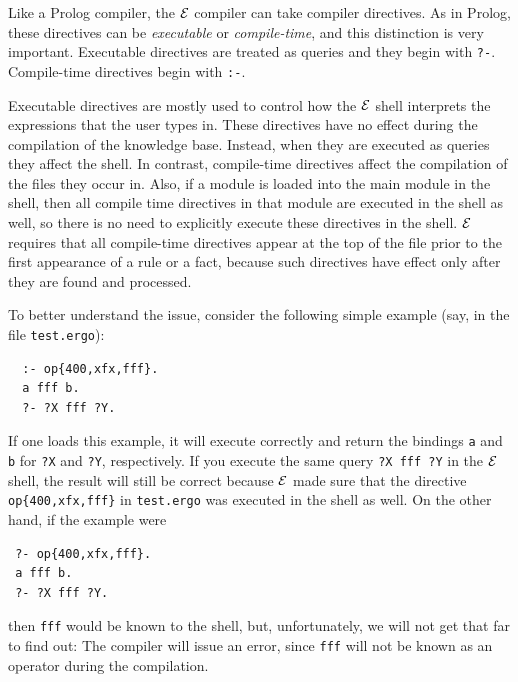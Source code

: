 \documentclass[11pt]{article}
\newcommand{\ERGO}{\mbox{\ensuremath{\cal{E}}\smaller{{\sc{RGO}}}}\xspace}
\newcommand{\FLSYSTEM}{\ERGO}
\newcommand{\ergoext}{ergo\xspace}
\begin{document}
Like a Prolog compiler, the \FLSYSTEM compiler can take compiler directives.
As in Prolog, these directives can be \emph{executable} or
\emph{compile-time}, and this distinction is very important.
Executable directives are treated as queries and they begin with {\tt ?-}.
Compile-time directives begin with {\tt :-}.

Executable directives are mostly used to control how the \FLSYSTEM shell
interprets the expressions that the user types in. These directives have no
effect during the compilation of the knowledge base. Instead, when they are
executed as queries they affect the shell. In contrast, compile-time
directives affect the compilation of the files they occur in. Also, if a
module is loaded into the main module in the shell, then all compile time
directives in that module are executed in the shell as well, so there is no
need to explicitly execute these directives in the shell.
\FLSYSTEM requires
that all compile-time directives appear at the top of the file prior to
the first appearance of a rule or a fact, because such directives have
effect only after they are found and processed.

To better understand the issue, consider the following simple example
(say, in the file {\tt test.\ergoext}):
\begin{verbatim}
  :- op{400,xfx,fff}.
  a fff b.
  ?- ?X fff ?Y.
\end{verbatim}
If one loads this example, it will execute correctly and return the
bindings {\tt a} and {\tt b} for {\tt ?X} and {\tt ?Y}, respectively.
If you execute the same query {\tt ?X fff ?Y} in the \FLSYSTEM shell,
the result will still be correct because \FLSYSTEM made sure that the
directive {\tt op\{400,xfx,fff\}} in
{\tt test.\ergoext} was executed in the shell as well.
On the other hand, if the example were
\begin{verbatim}
 ?- op{400,xfx,fff}.
 a fff b.
 ?- ?X fff ?Y.
\end{verbatim}
then {\tt fff} would be known to the shell, but, unfortunately, we
will not get that far to find out: The compiler will issue an error, since
{\tt fff} will not be known as an operator during the compilation.
\end{document}
